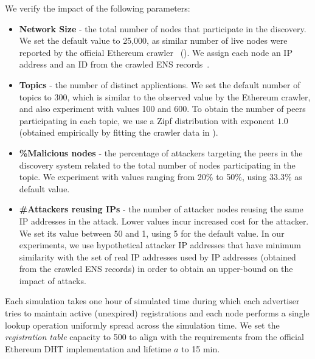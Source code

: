 \noindent
We verify the impact of the following parameters:
 \begin{itemize}
     \item \textbf{Network Size} - the total number of nodes that participate in the discovery. We set the default value to 25,000, as similar number of live nodes were reported by the official Ethereum crawler~\cite{discv4-dns-lists} (). We assign each node an IP address and an ID from the crawled ENS records~\cite{bauer2022ethereum}.%
     \item \textbf{Topics} - the number of distinct applications. We set the default number of topics to 300, which is similar to the observed value by the Ethereum crawler, and also experiment with values 100 and 600. To obtain the number of peers participating in each topic, we use a Zipf distribution with exponent $1.0$ (obtained empirically by fitting the crawler data in ). 
     \item \textbf{\%Malicious nodes} - the percentage of attackers targeting the peers in the discovery system related to the total number of nodes participating in the topic. We experiment with values ranging from 20\% to 50\%,  using 33.3\% as default value.%
     \item \textbf{\#Attackers reusing IPs} - the number of attacker nodes reusing the same IP addresses in the attack. Lower values incur increased cost for the attacker. We set its value between 50 and 1, using 5 for the default value.  In our experiments, we use hypothetical attacker IP addresses that have minimum similarity with the set of real IP addresses used by IP addresses (obtained from the crawled ENS records) in order to obtain an upper-bound on the impact of attacks. %

 \end{itemize}


Each simulation takes one hour of simulated time during which each advertiser tries to maintain active (\ie unexpired) registrations and each node performs a single lookup operation uniformly spread across the simulation time.  We set the \emph{registration table} capacity to 500 to align with the requirements from the official Ethereum DHT implementation and lifetime $a$ to 15 min.%

